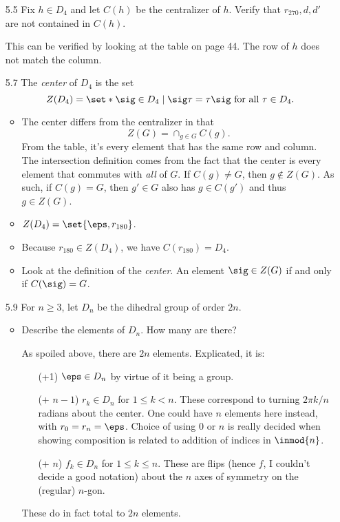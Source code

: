 \documentclass{article}
\begin{document}
\begin{enumerate}
  \item[5.5\rparen] Fix $h \in D_{4}$ and let $C(h)$ be the centralizer of $h$.
        Verify that $r_{270}, d, d'$ are not contained in $C(h)$.

        This can be verified by looking at the table on page 44.
        The row of $h$ does not match the column.

  \item[5.7\rparen] The \emph{center} of $D_{4}$ is the set
        \[ Z(D_{4}) = \set*{ \sig \in D_{4} \mid \sig \tau = \tau \sig \text{ for all } \tau \in D_{4} }. \]

        \begin{itemize}
          \item The center differs from the centralizer in that
                \[ Z(G) = \cap_{g \in G} C(g). \]
                From the table, it's every element that has the same row and column.
                The intersection definition comes from the fact that the center is every
                element that commutes with \emph{all} of $G$.
                If $C(g) \ne G$, then $g \notin Z(G)$.
                As such, if $C(g) = G$, then $g' \in G$ also has $g \in C(g')$ and thus $g \in Z(G)$.

          \item $Z(D_{4}) = \set{\eps, r_{180}}$.
          \item Because $r_{180} \in Z(D_{4})$, we have $C(r_{180}) = D_{4}$.
          \item Look at the definition of the \emph{center}.
                An element $\sig \in Z(G)$ if and only if $C(\sig) = G$.
        \end{itemize}

  \item[5.9\rparen] For $n \ge 3$, let $D_{n}$ be the dihedral group of order $2n$.
        \begin{itemize}
          \item Describe the elements of $D_{n}$. How many are there?

                As spoiled above, there are $2n$ elements. Explicated, it is:
                \begin{itemize}
                  \item[(+1)] $\eps \in D_{n}$ by virtue of it being a group.
                  \item[(+ $n-1$)] $r_{k} \in D_{n}$ for $1 \le k < n$.
                        These correspond to turning $2\pi k/n$ radians about the center.
                        One could have $n$ elements here instead, with $r_{0} = r_{n} = \eps$.
                        Choice of using 0 or $n$ is really decided when showing composition is related to
                        addition of indices in $\inmod{n}$.
                  \item[(+ $n$)] $f_{k} \in D_{n}$ for $1 \le k \le n$.
                        These are flips (hence $f$, I couldn't decide a good notation) about the $n$
                        axes of symmetry on the (regular) $n$-gon.
                \end{itemize}
                These do in fact total to $2n$ elements.


\end{itemize}
\end{enumerate}
\end{document}
